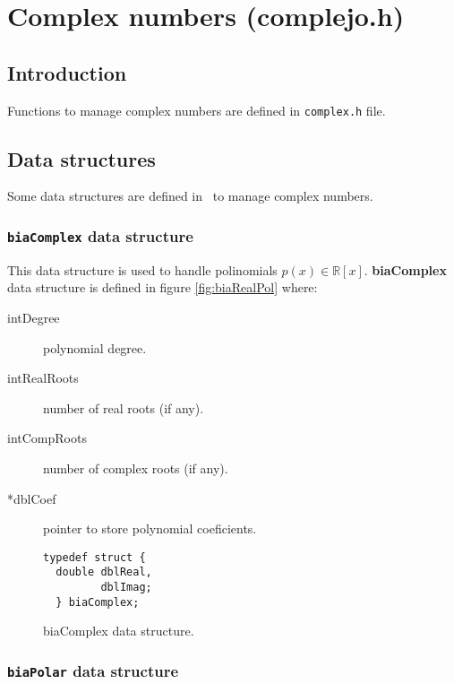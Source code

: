 %
%

\chapter{Complex numbers (complejo.h)}

\section{Introduction}

Functions to manage complex numbers are defined in \texttt{complex.h} file.

\section{Data structures}

Some data structures are defined in \BI \ to manage complex numbers.

\subsection{\texttt{biaComplex} data structure} \label{sec:biaComplex}

This data structure is used to handle polinomials $p(x) \in \mathbb{R}[x]$. \textbf{biaComplex} data structure is defined in figure \ref{fig:biaRealPol} where:

\begin{description}
\item[intDegree] polynomial degree.
\item[intRealRoots] number of real roots (if any).
\item[intCompRoots] number of complex roots (if any).
\item[*dblCoef] pointer to store polynomial coeficients.
\end{description}

\begin{figure}[!h]
\begin{verbatim}
typedef struct {
  double dblReal,
         dblImag;
  } biaComplex;
\end{verbatim}
\caption{biaComplex data structure.} \label{fig:biaComplex}
\end{figure}

\subsection{\texttt{biaPolar} data structure} \label{sec:biaPolar}

